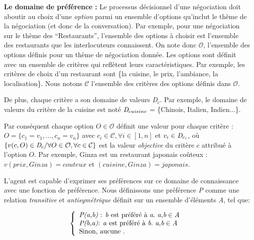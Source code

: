\documentclass [french]{sig-alternate-05-2015}
\begin{document}
\par \textbf{Le domaine de préférence :}
Le processus décisionnel d'une négociation  doit aboutir au choix d'une \emph{option} parmi un ensemble d'options qu'inclut le thème de la négociation (et donc de la conversation). Par exemple, pour une négociation sur le thème des ``Restaurants'', l'ensemble des options à choisir est l'ensemble des restaurants que les interlocuteurs connaissent.
 On note donc $\mathcal{O}$, l'ensemble des options définis pour un thème de négociation donnée. Les options sont définit avec un ensemble de critères qui reflètent leurs caractéristiques. Par exemple, les critères de choix d'un restaurant sont \{la cuisine, le prix, l'ambiance, la localisation\}. Nous notons $\mathcal{C}$ l'ensemble des critères des options définis dans $\mathcal{O}$.
 \par De plus, chaque critère a son domaine de valeurs \emph{D$_c$}. Par exemple, le domaine de valeurs du critère de la cuisine est noté $\emph{D}_{cuisine}$ = \{Chinois, Italien, Indien...\}.

\par Par conséquent chaque option $O\in \mathcal{O}$ définit une valeur pour chaque critère : 
$O = \{c_1=v_1,..., c_n=v_n\}$ avec $c_i \in \mathcal{C}, \forall i \in [1,n]$ et $v_i\in \emph{D}_{c_i}$, où $\{v(c,O) \in \emph{D}_{c} / \forall O \in \mathcal{O}, \forall c \in \mathcal{C}\}$ est la valeur \emph{objective} du critère $c$ attribué à l'option $O$. 
Par exemple, Ginza est un restaurant japonais coûteux : $v(prix, Ginza) = couteux $ et $(cuisine, Ginza) = japonais$. 


\par L'agent est capable d'exprimer ses préférences sur ce domaine de connaissance avec une fonction de préférence. Nous définissons une préférence \emph{P} comme une relation \emph{transitive} et \emph{antisymétrique} définit sur un ensemble d'éléments \emph{A}, tel que:

\[ \left \{
\begin{array}{l}
\emph{P(a,b)} $ : \emph{b}  est préféré à $\emph{a}. \emph{ a,b} \in \emph{A}\\
\emph{P(b,a)} $:  \emph{a} est préféré à  $\emph{b}. \emph{ a,b} \in \emph{A}\\
$Sinon, aucune . $\\
\end{array}
\right .\]
\end{document}
